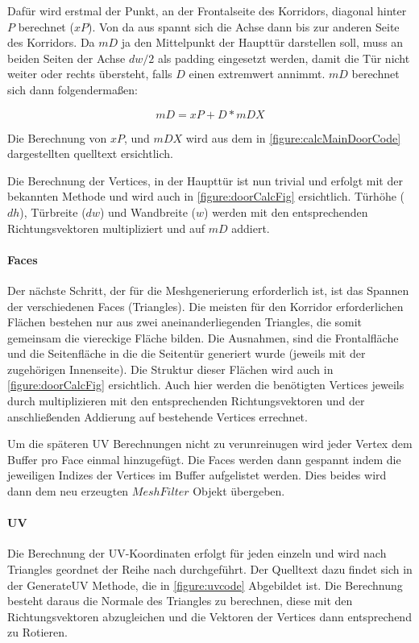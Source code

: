 Dafür wird erstmal der Punkt, an der Frontalseite des Korridors, diagonal hinter $P$ berechnet ($xP$). Von da aus spannt sich die Achse dann bis zur anderen Seite des Korridors. Da $mD$ ja den Mittelpunkt der Haupttür darstellen soll, muss an beiden Seiten der Achse $dw / 2$ als padding eingesetzt werden, damit die Tür nicht weiter oder rechts übersteht, falls $D$ einen extremwert annimmt. $mD$ berechnet sich dann folgendermaßen:

$$ mD = xP + D * mDX $$

Die Berechnung von $xP$, und $mDX$ wird aus dem in \autoref{figure:calcMainDoorCode}
dargestellten quelltext ersichtlich. %

Die Berechnung der Vertices, in der Haupttür ist nun trivial und erfolgt mit der bekannten Methode und wird auch in \autoref{figure:doorCalcFig} ersichtlich. Türhöhe ($dh$), Türbreite ($dw$) und Wandbreite ($w$) werden mit den entsprechenden Richtungsvektoren multipliziert und auf $mD$ addiert.

\begin{figure}[H]
    \centering
    \caption{} %
    \label{figure:calcMainDoorCode}
\end{figure}

\paragraph*{Faces}
Der nächste Schritt, der für die Meshgenerierung erforderlich ist, ist das Spannen der verschiedenen Faces (Triangles). Die meisten für den Korridor erforderlichen Flächen bestehen nur aus zwei aneinanderliegenden Triangles, die somit gemeinsam die viereckige Fläche bilden. Die Ausnahmen, sind die Frontalfläche und die Seitenfläche in die die Seitentür generiert wurde (jeweils mit der zugehörigen Innenseite). Die Struktur dieser Flächen wird auch in \autoref{figure:doorCalcFig} ersichtlich. Auch hier werden die benötigten Vertices jeweils durch multiplizieren mit den entsprechenden Richtungsvektoren und der anschließenden Addierung auf bestehende Vertices errechnet.

Um die späteren UV Berechnungen nicht zu verunreinugen wird jeder Vertex dem Buffer pro Face einmal hinzugefügt. Die Faces werden dann gespannt indem die jeweiligen Indizes der Vertices im Buffer aufgelistet werden. Dies beides wird dann dem neu erzeugten $MeshFilter$ Objekt übergeben.

\paragraph*{UV}
Die Berechnung der UV-Koordinaten erfolgt für jeden einzeln und wird nach Triangles geordnet der Reihe nach durchgeführt. Der Quelltext dazu findet sich in der GenerateUV Methode, die in \autoref{figure:uvcode} Abgebildet ist.
Die Berechnung besteht daraus die Normale des Triangles zu berechnen, diese mit den Richtungsvektoren abzugleichen und die Vektoren der Vertices dann entsprechend zu Rotieren.

